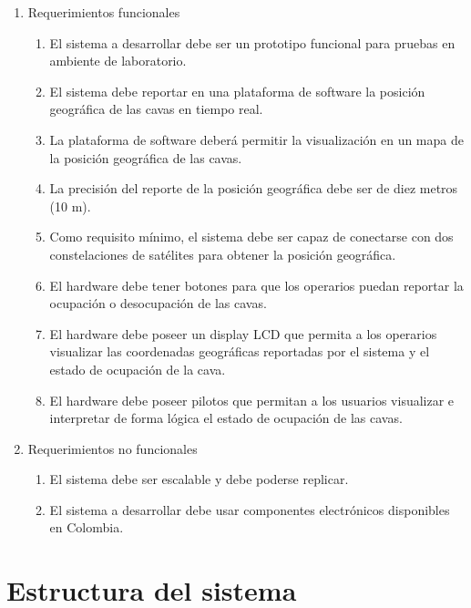 \begin{enumerate}
	\item Requerimientos funcionales
		\begin{enumerate}
            \item El sistema a desarrollar debe ser un prototipo funcional para pruebas en ambiente de laboratorio. 
			\item El sistema debe reportar en una plataforma de software la posición geográfica de las cavas en tiempo real.
            \item La plataforma de software deberá permitir la visualización en un mapa de la posición geográfica de las cavas.
			\item La precisión del reporte de la posición geográfica debe ser de diez metros (10 m). 
            \item Como requisito mínimo, el sistema debe ser capaz de conectarse con dos constelaciones de satélites para obtener la posición geográfica.  
            \item El hardware debe tener botones para que los operarios puedan reportar la ocupación o desocupación de las cavas. 
            \item El hardware debe poseer un display LCD que permita a los operarios visualizar las coordenadas geográficas reportadas por el sistema y el estado de ocupación de la cava. 
            \item El hardware debe poseer pilotos que permitan a los usuarios visualizar e interpretar de forma lógica el estado de ocupación de las cavas. 
		\end{enumerate}
	\item Requerimientos no funcionales
		\begin{enumerate}
			\item El sistema debe ser escalable y debe poderse replicar. 
			\item El sistema a desarrollar debe usar componentes electrónicos disponibles en Colombia. 
		\end{enumerate}
\end{enumerate}






\section{Estructura del sistema}
\label{sec:Estructura_sistema}

